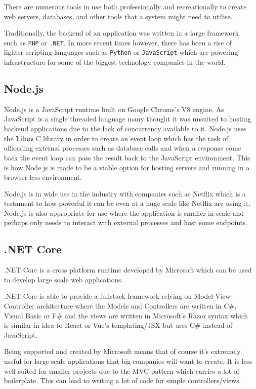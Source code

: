 There are numerous tools in use both professionally and recreationally to create web servers, databases, and other tools that a system might need to utilise. 

Traditionally, the backend of an application was written in a large framework such as \texttt{PHP} or \texttt{.NET}. In more recent times however, there has been a rise of lighter scripting languages such as \texttt{Python} or \texttt{JavaScript} which are powering infrastructure for some of the biggest technology companies in the world.

\subsection{Node.js}
Node.js \cite{nodejs} is a JavaScript runtime built on Google Chrome's V8 engine. As JavaScript is a single threaded language many thought it was unsuited to hosting backend applications due to the lack of concurrency available to it. Node.js uses the \texttt{libuv} C library \cite{libuv} in order to create an event loop which has the task of offloading external processes such as database calls and when a response come back the event loop can pass the result back to the JavaScript environment. This is how Node.js is made to be a viable option for hosting servers and running in a browser-less environment.

Node.js is in wide use in the industry with companies such as Netflix \cite{netflix-nodejs} which is a testament to how powerful it can be even at a huge scale like Netflix are using it. Node.js is also appropriate for use where the application is smaller in scale and perhaps only needs to interact with external processes and host some endpoints.

\subsection{.NET Core}

.NET Core \cite{.netcore} is a cross platform runtime developed by Microsoft which can be used to develop large scale web applications. 

.NET Core is able to provide a fullstack framework relying on Model-View-Controller architecture where the Models and Controllers are written in C\#, Visual Basic or F\# and the views are written in Microsoft's Razor syntax which is similar in idea to React or Vue's templating/JSX but uses C\# instead of JavaScript.

Being supported and created by Microsoft means that of course it's extremely useful for large scale applications that big companies will want to create. It is less well suited for smaller projects due to the MVC pattern which carries a lot of boilerplate. This can lead to writing a lot of code for simple controllers/views.

\pagebreak
